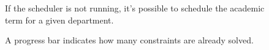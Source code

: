 \begin{multicols}{2}

\begin{figure}[H]
%
\caption{If the scheduler is not running, it's possible to schedule the academic term for a given department.}%
\end{figure}

\begin{figure}[H]
%
\caption{A progress bar indicates how many constraints are already solved.}%
\end{figure}

\end{multicols}
